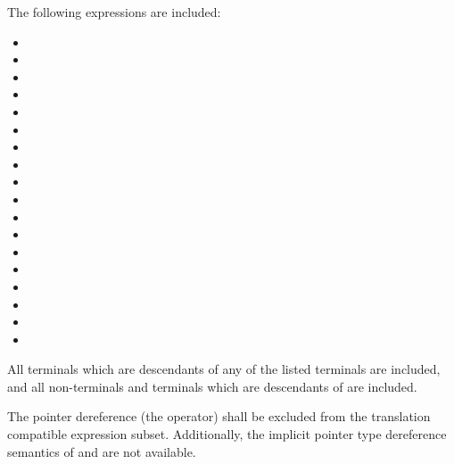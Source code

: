 \specsubitem
The following expressions are included:

\begin{minipage}[t][7cm][b]{\textwidth}
\begin{multicols}{2}
\begin{itemize}
\item {}
\item {}
\item {}
\item {}
\item {}
\item {}
\item {}
\item {}
\item {}
\item {}
\item {}
\item {}
\item {}
\item {}
\item {}
\item {}
\item {}
\item {}
\end{itemize}
\end{multicols}
\end{minipage}

\vspace{0.25cm}
\specsubitem
All terminals which are descendants of any of the listed terminals are
included, and all non-terminals and terminals which are descendants of
 are included.

\specsubitem
The pointer dereference  (the \terminal{*}
operator) shall be excluded from the translation compatible expression subset.
Additionally, the implicit pointer type dereference semantics of
 and  are
not available.

